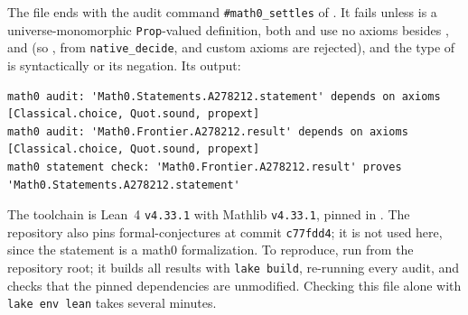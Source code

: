 \documentclass[11pt]{amsart}
\theoremstyle{plain}
\theoremstyle{definition}
\begin{document}
The file ends with the audit command \texttt{\#math0\_settles} of . It fails unless  is a universe-monomorphic \texttt{Prop}-valued definition, both  and  use no axioms besides ,  and  (so ,  from \texttt{native\_decide}, and custom axioms are rejected), and the type of  is syntactically  or its negation. Its output:
\begin{lstlisting}[basicstyle=\ttfamily\scriptsize]
math0 audit: 'Math0.Statements.A278212.statement' depends on axioms [Classical.choice, Quot.sound, propext]
math0 audit: 'Math0.Frontier.A278212.result' depends on axioms [Classical.choice, Quot.sound, propext]
math0 statement check: 'Math0.Frontier.A278212.result' proves 'Math0.Statements.A278212.statement'
\end{lstlisting}
The toolchain is Lean~4 \cite{Lean4} \texttt{v4.33.1} with Mathlib \cite{Mathlib} \texttt{v4.33.1}, pinned in . The repository also pins formal-conjectures \cite{FC} at commit \texttt{c77fdd4}; it is not used here, since the statement is a math0 formalization. To reproduce, run  from the repository root; it builds all results with \texttt{lake build}, re-running every audit, and checks that the pinned dependencies are unmodified. Checking this file alone with \texttt{lake env lean} takes several minutes.
\end{document}
